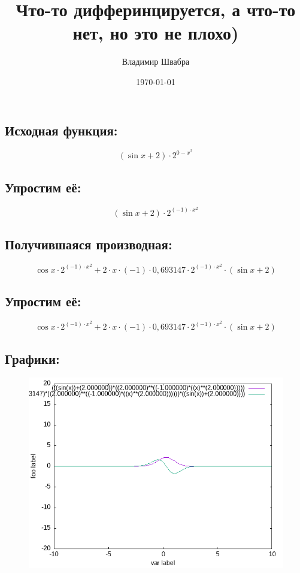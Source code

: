 \documentclass[a4paper]{article}
\title{Что-то дифферинцируется, а что-то нет, но это не плохо)}
\author{Владимир Швабра}
\date{\today}
\begin{document}
\maketitle
\newpage

\subsection{Исходная функция:}

$$
\left(\sin{x}+{2}\right)\cdot{2^{0-{x^{2}}}}
$$
\subsection{Упростим её:}

$$
\left(\sin{x}+{2}\right)\cdot{2^{\left(-1\right)\cdot{x^{2}}}}
$$
\subsection{Получившаяся производная:}

$$
\cos{x}\cdot{2^{\left(-1\right)\cdot{x^{2}}}}+{2\cdot{x}\cdot{\left(-1\right)}\cdot{0,693147\cdot{2^{\left(-1\right)\cdot{x^{2}}}}}\cdot{\left(\sin{x}+{2}\right)}}
$$
\subsection{Упростим её:}

$$
\cos{x}\cdot{2^{\left(-1\right)\cdot{x^{2}}}}+{2\cdot{x}\cdot{\left(-1\right)}\cdot{0,693147\cdot{2^{\left(-1\right)\cdot{x^{2}}}}}\cdot{\left(\sin{x}+{2}\right)}}
$$
\subsection{Графики:}

\begin{figure}[h]
\centering
\includegraphics[width=0.8\linewidth]{assets/input.tex_graphic.png}
\end{figure}
\end{document}
